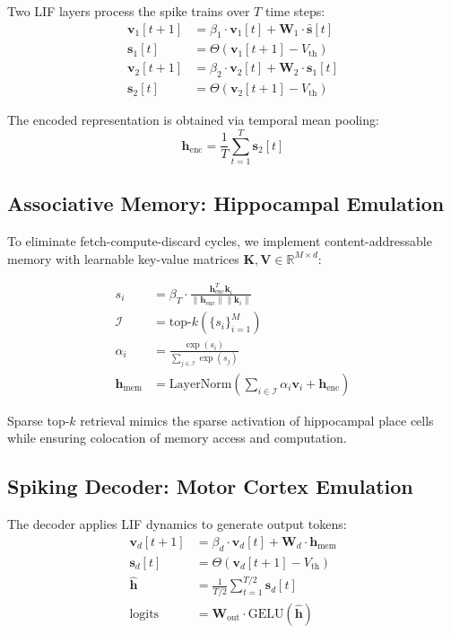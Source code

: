 \documentclass[11pt,a4paper]{article}
\newcommand{\R}{\mathbb{R}}
\newcommand{\spk}{\mathbf{s}}
\newcommand{\mem}{\mathbf{v}}
\newcommand{\W}{\mathbf{W}}
\newcommand{\h}{\mathbf{h}}
\begin{document}
Two LIF layers process the spike trains over $T$ time steps:
\begin{align}
    \mem_1[t+1] &= \beta_1 \cdot \mem_1[t] + \W_1 \cdot \bar{\spk}[t] \\
    \spk_1[t] &= \Theta(\mem_1[t+1] - V_{\text{th}}) \\
    \mem_2[t+1] &= \beta_2 \cdot \mem_2[t] + \W_2 \cdot \spk_1[t] \\
    \spk_2[t] &= \Theta(\mem_2[t+1] - V_{\text{th}})
\end{align}

The encoded representation is obtained via temporal mean pooling:
\begin{equation}
    \h_{\text{enc}} = \frac{1}{T} \sum_{t=1}^{T} \spk_2[t]
\end{equation}

\subsection{Associative Memory: Hippocampal Emulation}

To eliminate fetch-compute-discard cycles, we implement content-addressable memory with learnable key-value matrices $\mathbf{K}, \mathbf{V} \in \R^{M \times d}$:

\begin{align}
    s_i &= \beta_T \cdot \frac{\h_{\text{enc}}^T \mathbf{k}_i}{\|\h_{\text{enc}}\| \|\mathbf{k}_i\|} \\
    \mathcal{I} &= \text{top-}k(\{s_i\}_{i=1}^M) \\
    \alpha_i &= \frac{\exp(s_i)}{\sum_{j \in \mathcal{I}} \exp(s_j)} \\
    \h_{\text{mem}} &= \text{LayerNorm}\left(\sum_{i \in \mathcal{I}} \alpha_i \mathbf{v}_i + \h_{\text{enc}}\right)
\end{align}

Sparse top-$k$ retrieval mimics the sparse activation of hippocampal place cells while ensuring colocation of memory access and computation.

\subsection{Spiking Decoder: Motor Cortex Emulation}

The decoder applies LIF dynamics to generate output tokens:
\begin{align}
    \mem_d[t+1] &= \beta_d \cdot \mem_d[t] + \W_d \cdot \h_{\text{mem}} \\
    \spk_d[t] &= \Theta(\mem_d[t+1] - V_{\text{th}}) \\
    \hat{\h} &= \frac{1}{T/2} \sum_{t=1}^{T/2} \spk_d[t] \\
    \text{logits} &= \W_{\text{out}} \cdot \text{GELU}(\hat{\h})
\end{align}
\end{document}
